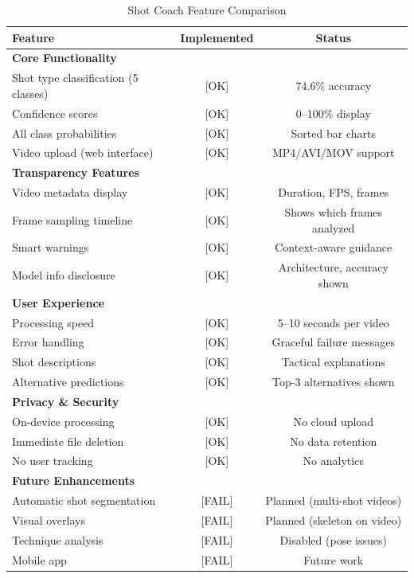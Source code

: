 \documentclass[11pt,a4paper]{article}
\begin{document}
\begin{table}[H]
\centering
\caption{Shot Coach Feature Comparison}
\begin{tabular}{lcc}
\toprule
Feature & Implemented & Status \\
\midrule
\textbf{Core Functionality} & & \\
\quad Shot type classification (5 classes) & [OK] & 74.6\% accuracy \\
\quad Confidence scores & [OK] & 0--100\% display \\
\quad All class probabilities & [OK] & Sorted bar charts \\
\quad Video upload (web interface) & [OK] & MP4/AVI/MOV support \\
\midrule
\textbf{Transparency Features} & & \\
\quad Video metadata display & [OK] & Duration, FPS, frames \\
\quad Frame sampling timeline & [OK] & Shows which frames analyzed \\
\quad Smart warnings & [OK] & Context-aware guidance \\
\quad Model info disclosure & [OK] & Architecture, accuracy shown \\
\midrule
\textbf{User Experience} & & \\
\quad Processing speed & [OK] & 5--10 seconds per video \\
\quad Error handling & [OK] & Graceful failure messages \\
\quad Shot descriptions & [OK] & Tactical explanations \\
\quad Alternative predictions & [OK] & Top-3 alternatives shown \\
\midrule
\textbf{Privacy \& Security} & & \\
\quad On-device processing & [OK] & No cloud upload \\
\quad Immediate file deletion & [OK] & No data retention \\
\quad No user tracking & [OK] & No analytics \\
\midrule
\textbf{Future Enhancements} & & \\
\quad Automatic shot segmentation & [FAIL] & Planned (multi-shot videos) \\
\quad Visual overlays & [FAIL] & Planned (skeleton on video) \\
\quad Technique analysis & [FAIL] & Disabled (pose issues) \\
\quad Mobile app & [FAIL] & Future work \\
\bottomrule
\end{tabular}
\end{table}
\end{document}
